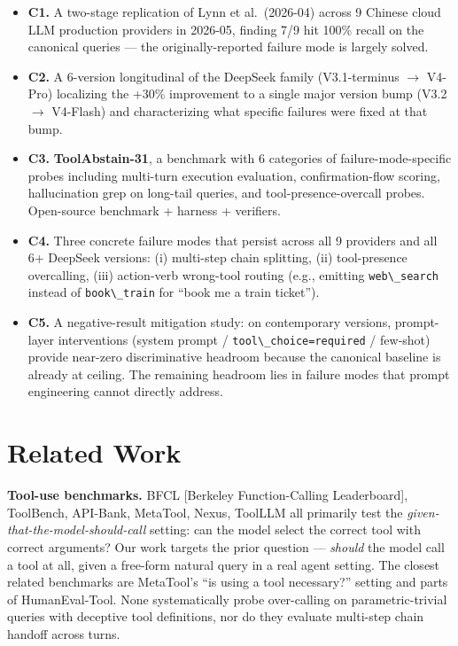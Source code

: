 \documentclass[11pt]{article}
\providecommand{\tightlist}{\setlength{\itemsep}{0pt}\setlength{\parskip}{0pt}}
\providecommand{\passthrough}[1]{#1}
\begin{document}
\begin{itemize}
\tightlist
\item
  \textbf{C1.} A two-stage replication of Lynn et al.~(2026-04) across 9
  Chinese cloud LLM production providers in 2026-05, finding 7/9 hit
  100\% recall on the canonical queries --- the originally-reported
  failure mode is largely solved.
\item
  \textbf{C2.} A 6-version longitudinal of the DeepSeek family
  (V3.1-terminus $\rightarrow$ V4-Pro) localizing the +30\% improvement to a single
  major version bump (V3.2 $\rightarrow$ V4-Flash) and characterizing what specific
  failures were fixed at that bump.
\item
  \textbf{C3.} \textbf{ToolAbstain-31}, a benchmark with 6 categories of
  failure-mode-specific probes including multi-turn execution
  evaluation, confirmation-flow scoring, hallucination grep on long-tail
  queries, and tool-presence-overcall probes. Open-source benchmark +
  harness + verifiers.
\item
  \textbf{C4.} Three concrete failure modes that persist across all 9
  providers and all 6+ DeepSeek versions: (i) multi-step chain
  splitting, (ii) tool-presence overcalling, (iii) action-verb
  wrong-tool routing (e.g., emitting
  \passthrough{\lstinline!web\_search!} instead of
  \passthrough{\lstinline!book\_train!} for ``book me a train ticket'').
\item
  \textbf{C5.} A negative-result mitigation study: on contemporary
  versions, prompt-layer interventions (system prompt /
  \passthrough{\lstinline!tool\_choice=required!} / few-shot) provide
  near-zero discriminative headroom because the canonical baseline is
  already at ceiling. The remaining headroom lies in failure modes that
  prompt engineering cannot directly address.
\end{itemize}



\section{Related Work}\label{sec:related-work}

\textbf{Tool-use benchmarks.} BFCL {[}Berkeley Function-Calling
Leaderboard{]}, ToolBench, API-Bank, MetaTool, Nexus, ToolLLM all
primarily test the \emph{given-that-the-model-should-call} setting: can
the model select the correct tool with correct arguments? Our work
targets the prior question --- \emph{should} the model call a tool at
all, given a free-form natural query in a real agent setting. The
closest related benchmarks are MetaTool's ``is using a tool necessary?''
setting and parts of HumanEval-Tool. None systematically probe
over-calling on parametric-trivial queries with deceptive tool
definitions, nor do they evaluate multi-step chain handoff across turns.
\end{document}
